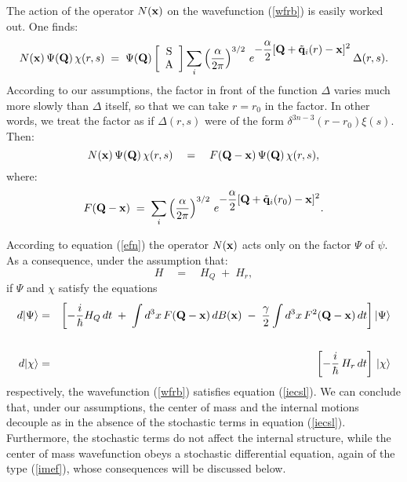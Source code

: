 \documentclass[12pt]{article}
\begin{document}
The action of the operator $N({\bf x})$ on the wavefunction
(\ref{wfrb}) is easily worked out. One finds:
\begin{equation}
N({\bf x})\, \Psi ({\bf Q})\, \chi (r, s) \; = \; \Psi ({\bf Q})
\left[
\begin{array}{c}
\makebox{S} \\ \makebox{A}
\end{array}
\right]
 \sum_{i} \left(\frac{\alpha}{2\pi}\right)^{3/2}\,
e^{\displaystyle  - \frac{\alpha}{2} [{\bf Q} + \tilde{\bf
q}_{i}(r) - {\bf x} ]^{2}}\, \Delta (r,s).
\end{equation}
According to our assumptions, the factor in front of the function
$\Delta$ varies much more slowly than $\Delta$ itself, so that we
can take $r = r_{0}$ in the factor. In other words, we treat the
factor as if $\Delta (r, s)$ were of the form $\delta^{3n-3} (r -
r_{0}) \xi (s)$. Then:
\begin{equation} \label{efn}
N({\bf x})\, \Psi ({\bf Q})\, \chi (r, s) \quad = \quad F({\bf Q}
- {\bf x})\, \Psi ({\bf Q})\, \chi (r, s) ,
\end{equation}
where:
\begin{equation} \label{ecslw}
F({\bf Q} - {\bf x})\; = \; \sum_{i}
\left(\frac{\alpha}{2\pi}\right)^{3/2}\, e^{\displaystyle  -
\frac{\alpha}{2} [{\bf Q} + \tilde{\bf q}_{i}(r_{0}) - {\bf x}
]^{2}}.
\end{equation}

According to equation (\ref{efn}) the operator $N({\bf x})$ acts
only on the factor $\Psi$ of $\psi$. As a consequence, under the
assumption that:
\[
H \quad = \quad  H_{Q}\; + \; H_{r},
\]
if $\Psi$ and $\chi$ satisfy the equations
\begin{eqnarray}
d |\Psi \rangle & = & \left[ - \frac{i}{\hbar} H_{Q}\, dt  \; + \;
\int d^{3} x\, F({\bf Q} - {\bf x})\, dB({\bf x}) \; - \;
\frac{\gamma}{2} \int d^{3} x\, F^{2}({\bf Q} - {\bf x})\, dt
\right] |\Psi\rangle \nonumber \\
& & \label{cmie} \\
d |\chi\rangle & = &  \left[ - \frac{i}{\hbar}\, H_{ r}\, dt
\right]\, |\chi\rangle \label{odghj}
\end{eqnarray}
respectively, the wavefunction (\ref{wfrb}) satisfies equation
(\ref{iecsl}). We can conclude that, under our assumptions, the
center of mass and the internal motions decouple as in the absence
of the stochastic terms in equation (\ref{iecsl}). Furthermore,
the stochastic terms do not affect the internal structure, while
the center of mass wavefunction obeys a stochastic differential
equation, again of the type (\ref{imef}), whose consequences will
be discussed below.
\end{document}
